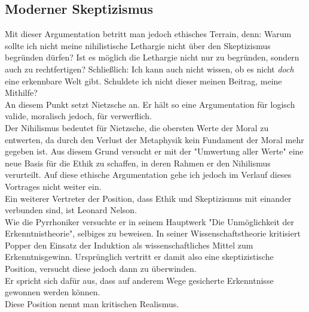 \documentclass[11pt,a4paper]{article}
\begin{document}
	\subsection{Moderner Skeptizismus}
Mit dieser Argumentation betritt man jedoch ethisches Terrain, denn: Warum sollte ich nicht meine nihilistische Lethargie nicht über den Skeptizismus begründen dürfen? Ist es möglich die Lethargie nicht nur zu begründen, sondern auch zu rechtfertigen? Schließlich: Ich kann auch nicht wissen, ob es nicht \emph{doch} eine erkennbare Welt gibt. Schuldete ich nicht dieser meinen Beitrag, meine Mithilfe?\\
An diesem Punkt setzt Nietzsche an. Er hält so eine Argumentation für logisch valide, moralisch jedoch, für verwerflich.\\%
Der Nihilismus bedeutet für Nietzsche, die obersten Werte der Moral zu entwerten, da durch den Verlust der Metaphysik kein Fundament der Moral mehr gegeben ist. Aus diesem Grund versucht er mit der "Umwertung aller Werte" eine neue Basis für die Ethik zu schaffen, in deren Rahmen er den Nihilismus verurteilt. Auf diese ethische Argumentation gehe ich jedoch im Verlauf dieses Vortrages nicht weiter ein.\\
Ein weiterer Vertreter der Position, dass Ethik und Skeptizismus mit einander verbunden sind, ist Leonard Nelson.\\
Wie die Pyrrhoniker versuchte er in seinem Hauptwerk "Die Unmöglichkeit der Erkenntnistheorie", selbiges zu beweisen.
In seiner Wissenschaftstheorie kritisiert Popper den Einsatz der Induktion als wissenschaftliches Mittel zum Erkenntnisgewinn. Ursprünglich vertritt er damit also eine skeptizistische Position, versucht diese jedoch dann zu überwinden.\\
Er spricht sich dafür aus, dass auf anderem Wege gesicherte Erkenntnisse gewonnen werden können.\\
Diese Position nennt man kritischen Realismus.%


\end{document}
